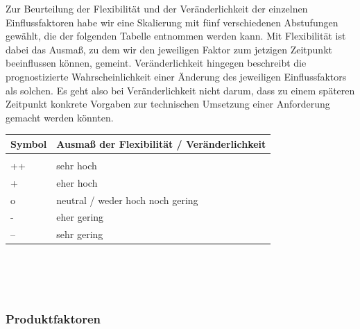 \documentclass[enabledeprecatedfontcommands,fontsize=11pt,paper=a4,twoside]{scrartcl}
\newcounter{one}
\begin{document}
Zur Beurteilung der Flexibilität und der Veränderlichkeit der einzelnen Einflussfaktoren habe wir eine Skalierung mit fünf verschiedenen Abstufungen gewählt, die der folgenden Tabelle entnommen werden kann. Mit Flexibilität ist dabei das Ausmaß, zu dem wir den jeweiligen Faktor zum jetzigen Zeitpunkt beeinflussen können, gemeint. Veränderlichkeit hingegen beschreibt die prognostizierte Wahrscheinlichkeit einer Änderung des jeweiligen Einflussfaktors als solchen. Es geht also bei Veränderlichkeit nicht darum, dass zu einem späteren Zeitpunkt konkrete Vorgaben zur technischen Umsetzung einer Anforderung gemacht werden könnten. \\

\begin{tabular}{p{2cm}p{8cm}}
	Symbol & Ausmaß der Flexibilität / Veränderlichkeit \\ \hline \\
	++ & sehr hoch \\ 
	+ & eher hoch \\ 
	o & neutral / weder hoch noch gering \\ 
	- & eher gering \\ 
	-- & sehr gering \\ 
\end{tabular}\\ \\ \\




\newpage
\def\arraystretch{1.5}
\subsubsection{Produktfaktoren}
\setcounter{one}{1}
\end{document}
